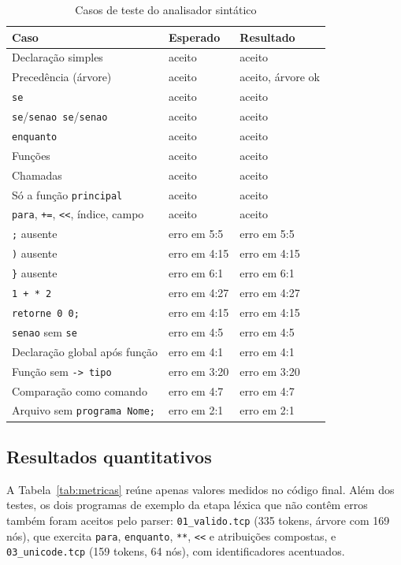 \documentclass[conference,a4paper]{IEEEtran}
\newcommand{\cod}[1]{\texttt{#1}}
\begin{document}
\begin{table}[t]
\caption{Casos de teste do analisador sintático}
\label{tab:testes}
\centering
\footnotesize
\begin{tabular}{@{}lll@{}}
\toprule
Caso & Esperado & Resultado \\
\midrule
Declaração simples & aceito & aceito \\
Precedência (árvore) & aceito & aceito, árvore ok \\
\cod{se} & aceito & aceito \\
\cod{se}/\cod{senao se}/\cod{senao} & aceito & aceito \\
\cod{enquanto} & aceito & aceito \\
Funções & aceito & aceito \\
Chamadas & aceito & aceito \\
Só a função \cod{principal} & aceito & aceito \\
\cod{para}, \cod{+=}, \cod{<<}, índice, campo & aceito & aceito \\
\midrule
\cod{;} ausente & erro em 5:5 & erro em 5:5 \\
\cod{)} ausente & erro em 4:15 & erro em 4:15 \\
\cod{\}} ausente & erro em 6:1 & erro em 6:1 \\
\cod{1 + * 2} & erro em 4:27 & erro em 4:27 \\
\cod{retorne 0 0;} & erro em 4:15 & erro em 4:15 \\
\cod{senao} sem \cod{se} & erro em 4:5 & erro em 4:5 \\
Declaração global após função & erro em 4:1 & erro em 4:1 \\
Função sem \cod{-> tipo} & erro em 3:20 & erro em 3:20 \\
Comparação como comando & erro em 4:7 & erro em 4:7 \\
Arquivo sem \cod{programa Nome;} & erro em 2:1 & erro em 2:1 \\
\bottomrule
\end{tabular}
\end{table}

\subsection{Resultados quantitativos}

A Tabela~\ref{tab:metricas} reúne apenas valores medidos no código final. Além dos testes, os dois programas de exemplo da etapa léxica que não contêm erros também foram aceitos pelo parser: \cod{01\_valido.tcp} (335 tokens, árvore com 169 nós), que exercita \cod{para}, \cod{enquanto}, \cod{**}, \cod{<<} e atribuições compostas, e \cod{03\_unicode.tcp} (159 tokens, 64 nós), com identificadores acentuados.
\end{document}
